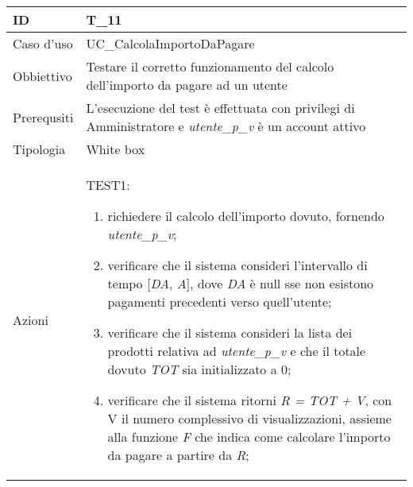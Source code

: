 \begin{table}[hb]
    \centering
    \begin{tabular}{ |p{2cm}|p{10cm}|  }
        \hline
        ID          & T\_11                                                                                                     \\\hline
        Caso d'uso  & UC\_CalcolaImportoDaPagare                                                                                \\\hline
        Obbiettivo  & Testare il corretto funzionamento del calcolo dell'importo da pagare ad un utente                         \\\hline
        Prerequsiti & L'esecuzione del test è effettuata con privilegi di Amministratore e \emph{utente\_p\_v} è un account attivo \\\hline
        Tipologia   & White box                                                                                                 \\\hline
        Azioni      &
        TEST1:
        \begin{enumerate}[nosep, topsep=0pt]
            \item richiedere il calcolo dell'importo dovuto, fornendo \emph{utente\_p\_v};
            \item verificare che il sistema consideri l'intervallo di tempo [\emph{DA}, \emph{A}], dove \emph{DA} è null sse non esistono pagamenti precedenti verso quell'utente;
            \item verificare che il sistema consideri la lista dei prodotti relativa ad \emph{utente\_p\_v} e che il totale dovuto \emph{TOT} sia initializzato a 0;
            \item verificare che il sistema ritorni \emph{R = TOT + V}, con V il numero complessivo di visualizzazioni, assieme alla funzione \emph{F} che indica come calcolare l'importo da pagare a partire da \emph{R};
        \end{enumerate}
        \\\hline
    \end{tabular}
\end{table}

